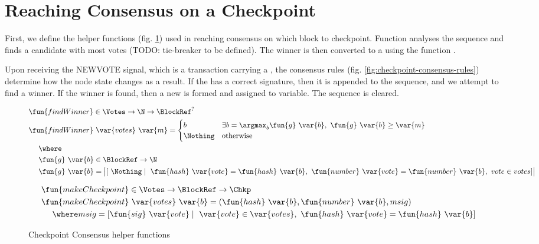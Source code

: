 \clearpage
\section{Reaching Consensus on a Checkpoint}

First, we define the helper functions (fig. \ref{fig:checkpoint-consensus-helpers}) used in reaching consensus on which block to checkpoint. Function  analyses the  sequence and finds a candidate with most votes (TODO: tie-breaker to be defined). The winner is then converted to a \Chkp using the function .

Upon receiving the NEWVOTE signal, which is a transaction carrying a , the consensus rules (fig. \ref{fig:checkpoint-consensus-rules}) determine how the node state changes as a result. If the  has a correct signature, then it is appended to the  sequence, and we attempt to find a winner. If the winner is found, then a new \Chkp is formed and assigned to  variable. The  sequence is cleared. 

\begin{figure}[tbh]
  \begin{align*}
    & \fun{findWinner} \in \Votes \to \N \to \BlockRef^?\\
    & \fun{findWinner}~\var{votes}~\var{m} =
      \begin{cases}
        b & \exists b = \argmax_b \fun{g}~\var{b},~ \fun{g}~\var{b} \geq \var{m}  \\
        \Nothing & \text{otherwise}
      \end{cases} \\
    & ~~~~\where \\
    & ~~~~\fun{g}~\var{b} \in \BlockRef \to \N \\
    & ~~~~\fun{g}~\var{b} = \big\lvert [~\Nothing \mid\ \fun{hash}~\var{vote} = \fun{hash}~\var{b},~ \fun{number}~\var{vote} = \fun{number}~\var{b},~ vote \in votes] \big\rvert
  \end{align*}

  \begin{align*}
    & \fun{makeCheckpoint} \in \Votes \to \BlockRef \to \Chkp \\
    & \fun{makeCheckpoint}~\var{votes}~\var{b} = (\fun{hash}~\var{b}, \fun{number}~\var{b}, msig) \\
    & ~~~~\where msig = [\fun{sig}~\var{vote} \mid\ \var{vote} \in \var{votes},~ \fun{hash}~\var{vote} = \fun{hash}~\var{b}]
  \end{align*}

  \caption{Checkpoint Consensus helper functions}
  \label{fig:checkpoint-consensus-helpers}
\end{figure}

